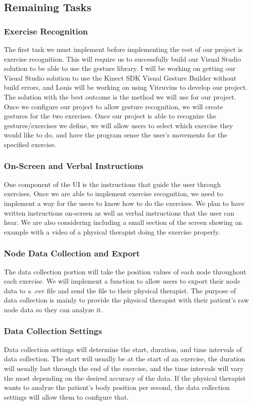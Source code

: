 \documentclass[onecolumn, draftclsnofoot,10pt, compsoc]{IEEEtran}
\begin{document}
\subsection{Remaining Tasks}
\subsubsection{Exercise Recognition}
The first task we must implement before implementing the rest of our project is exercise recognition. This will require us to successfully build our Visual Studio solution to be able to use the gesture library. I will be working on getting our Visual Studio solution to use the Kinect SDK Visual Gesture Builder without build errors, and Louis will be working on using Vitruvius to develop our project. The solution with the best outcome is the method we will use for our project. Once we configure our project to allow gesture recognition, we will create gestures for the two exercises. Once our project is able to recognize the gestures/exercises we define, we will allow users to select which exercise they would like to do, and have the program sense the user's movements for the specified exercise.

\subsubsection{On-Screen and Verbal Instructions}
One component of the UI is the instructions that guide the user through exercises. Once we are able to implement exercise recognition, we need to implement a way for the users to know how to do the exercises. We plan to have written instructions on-screen as well as verbal instructions that the user can hear. We are also considering including a small section of the screen showing an example with a video of a physical therapist doing the exercise properly.

\subsubsection{Node Data Collection and Export}
The data collection portion will take the position values of each node throughout each exercise. We will implement a function to allow users to export their node data to a .csv file and send the file to their physical therapist. The purpose of data collection is mainly to provide the physical therapist with their patient's raw node data so they can analyze it.

\subsubsection{Data Collection Settings}
Data collection settings will determine the start, duration, and time intervals of data collection. The start will usually be at the start of an exercise, the duration will usually last through the end of the exercise, and the time intervals will vary the most depending on the desired accuracy of the data. If the physical therapist wants to analyze the patient's body position per second, the data collection settings will allow them to configure that.
\end{document}
